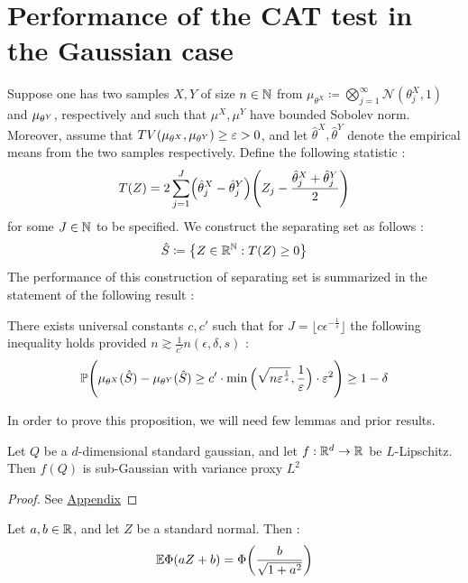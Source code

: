 \section{Performance of the CAT test in the Gaussian case}
Suppose one has two samples $X,Y$ of size $n\in \mathbb{N}$ from $\mu_{\theta^X} \coloneqq \bigotimes_{j=1}^\infty \mathcal{N}(\theta_j^X,1)$ and $\mu_{\theta^Y}$, respectively and such that $\mu^X,\mu^Y$ have bounded Sobolev norm. 
Moreover, assume that $TV(\mu_{\theta^X},\mu_{\theta^Y}) \geq \varepsilon >0$, and let $\hat{\theta}^X, \hat{\theta}^Y$ denote the empirical means from the two samples respectively.
Define the following statistic : 
\begin{equation}\label{statseparating}
    T(Z) = 2\sum_{j=1}^{J} \Bigl(\hat{\theta}_j^X-\hat{\theta}_j^Y\Bigr)\Biggl(Z_j - \frac{\hat{\theta}_j^X+\hat{\theta}_j^Y}{2}\Biggr)
\end{equation}
for some $J\in \mathbb{N}$ to be specified. We construct the separating set as follows : \begin{equation}\label{sepset}
    \hat{S} \coloneqq \bigl\{Z \in \mathbb{R}^{\mathbb{N}} : T(Z)\geq 0\bigr\}
\end{equation}
The performance of this construction of separating set is summarized in the statement of the following result : 
\begin{prop}\citet{gerberclas}\label{CATperf}
    There exists universal constants $c,c'$ such that for $J = \big\lfloor c\epsilon^{-\frac{1}{s}}\big\rfloor$ the following inequality holds provided $n \gtrsim \frac{1}{c'}n(\epsilon,\delta,s)$ : 
    \begin{equation}\label{ineqperf}
        \mathbb{P}\Bigg( \mu_{\theta^X}(\hat{S}) - \mu_{\theta^Y}(\hat{S}) \geq c'\cdot \min\Big(\sqrt{n\varepsilon^{\frac{1}{s}}},\frac{1}{\varepsilon}\Big)\cdot \varepsilon^2 \Bigg) \geq 1 -\delta
    \end{equation}
\end{prop}
In order to prove this proposition, we will need few lemmas and prior results. 
\begin{lemma}\label{LipschitzConc}
    Let $Q$ be a $d$-dimensional standard gaussian, and let $f : \mathbb{R}^d \rightarrow \mathbb{R}$ be $L$-Lipschitz. Then $f(Q)$ is sub-Gaussian with variance proxy $L^2$
\end{lemma}
\begin{proof}
    See \hyperref[appendix]{Appendix}
\end{proof}
\begin{lemma}\label{gaussianexpec}
    Let $a,b\in \mathbb{R}$, and let $Z$ be a standard normal. Then : \begin{equation*}
        \mathbb{E} \Phi(aZ+b) = \Phi\bigg(\frac{b}{\sqrt{1+a^2}}\bigg)
    \end{equation*}
\end{lemma}

